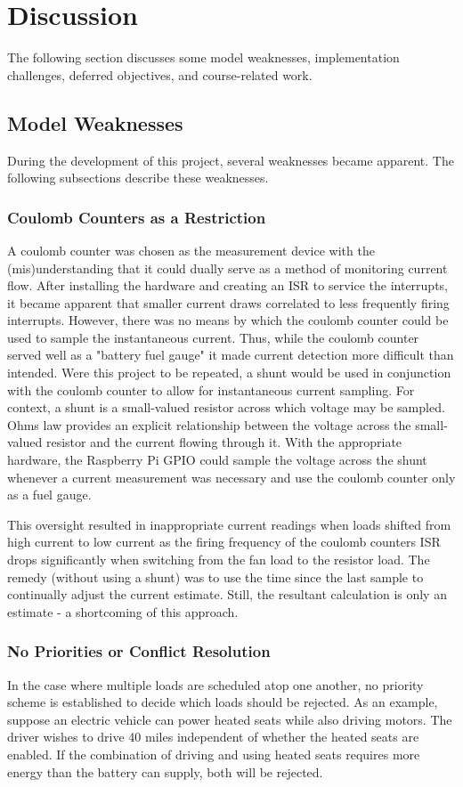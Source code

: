 \documentclass[11pt,conference,draftcls,onecolumn]{IEEEtran}
\begin{document}
\section{Discussion}\label{sec:discussion}
The following section discusses some model weaknesses, implementation challenges, deferred objectives, and course-related work.

\subsection{Model Weaknesses}
During the development of this project, several weaknesses became apparent.
The following subsections describe these weaknesses.

\subsubsection{Coulomb Counters as a Restriction}
A coulomb counter was chosen as the measurement device with the (mis)understanding that it could dually serve as a method of monitoring current flow.
After installing the hardware and creating an ISR to service the interrupts, it became apparent that smaller current draws correlated to less frequently firing interrupts.
However, there was no means by which the coulomb counter could be used to sample the instantaneous current.
Thus, while the coulomb counter served well as a "battery fuel gauge" it made current detection more difficult than intended.
Were this project to be repeated, a shunt would be used in conjunction with the coulomb counter to allow for instantaneous current sampling.
For context, a shunt is a small-valued resistor across which voltage may be sampled.
Ohms law provides an explicit relationship between the voltage across the small-valued resistor and the current flowing through it.
With the appropriate hardware, the Raspberry Pi GPIO could sample the voltage across the shunt whenever a current measurement was necessary and use the coulomb counter only as a fuel gauge.

This oversight resulted in inappropriate current readings when loads shifted from high current to low current as the firing frequency of the coulomb counters ISR drops significantly when switching from the fan load to the resistor load.
The remedy (without using a shunt) was to use the time since the last sample to continually adjust the current estimate.
Still, the resultant calculation is only an estimate - a shortcoming of this approach.

\subsubsection{No Priorities or Conflict Resolution}
In the case where multiple loads are scheduled atop one another, no priority scheme is established to decide which loads should be rejected.
As an example, suppose an electric vehicle can power heated seats while also driving motors.
The driver wishes to drive 40 miles independent of whether the heated seats are enabled.
If the combination of driving and using heated seats requires more energy than the battery can supply, both will be rejected.
\end{document}
